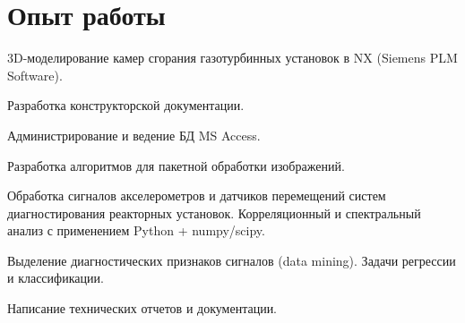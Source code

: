 \documentclass[a4paper]{resume}
\begin{document}
\begin{minipage}[t]{0.66\textwidth} %

\section{Опыт работы}


\vspace{\topsep} %
\begin{tightitemize}
\item 3D-моделирование камер сгорания газотурбинных установок в NX (Siemens PLM Software).
\item Разработка конструкторской документации.
\end{tightitemize}

\sectionspace 


\begin{tightitemize}
\item Администрирование и ведение БД MS Access.
\item Разработка алгоритмов для пакетной обработки изображений. 
\end{tightitemize}

\sectionspace 


\begin{tightitemize}
\item Обработка сигналов акселерометров и датчиков перемещений систем диагностирования реакторных установок. Корреляционный и спектральный анализ с применением Python + numpy/scipy.
\item Выделение диагностических признаков сигналов (data mining). Задачи регрессии и классификации.
\item Написание технических отчетов и документации.
\end{tightitemize}

\sectionspace 


\end{minipage}
\end{document}
